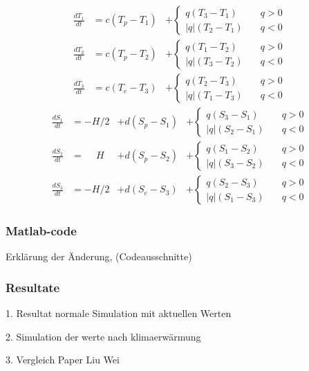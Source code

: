 \begin{equation}
\begin{aligned}
\frac{dT_1}{dt} &= c(T_p-T_1)&+ \begin{cases} q(T_3-T_1) & \quad q>0 \\ |q|(T_2-T_1) & \quad q<0 \end{cases}
\\
\frac{dT_2}{dt} &= c(T_p-T_2)&+\begin{cases} q(T_1-T_2) & \quad q>0 \\ |q|(T_3-T_2) & \quad q<0 \end{cases}
\\
\frac{dT_3}{dt} &= c(T_e-T_3)&+\begin{cases} q(T_2-T_3) & \quad q>0 \\ |q|(T_1-T_3) & \quad q<0 \end{cases}
\end{aligned}
\end{equation}
\begin{equation}
\begin{aligned}
\frac{dS_1}{dt} &= -H/2 &+ d(S_p-S_1)&+\begin{cases} q(S_3-S_1) & \quad q>0 \\ |q|(S_2-S_1) & \quad q<0 \end{cases}
\\
\frac{dS_2}{dt} &= \phantom{-}H &+ d(S_p-S_2)&+\begin{cases} q(S_1-S_2) & \quad q>0 \\ |q|(S_3-S_2) & \quad q<0 \end{cases}	
\\
\frac{dS_3}{dt} &= -H/2 &+d(S_e-S_3)&+\begin{cases} q(S_2-S_3) & \quad q>0 \\ |q|(S_1-S_3) & \quad q<0 \end{cases}
\end{aligned}
\end{equation}	
\subsubsection{Matlab-code}

Erklärung der Änderung, (Codeausschnitte)


\subsubsection{Resultate} 

1. Resultat normale Simulation mit aktuellen Werten

2. Simulation der werte nach klimaerwärmung

3. Vergleich Paper Liu Wei


